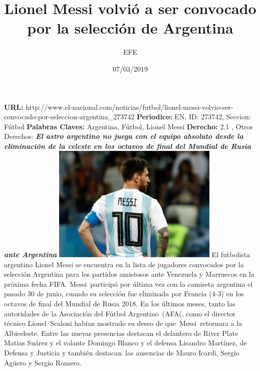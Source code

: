 \documentclass{article}%
\title{\textbf{Lionel Messi volvió a ser convocado por la selección de Argentina}}%
\author{EFE}%
\date{07/03/2019}%
\begin{document}
%
\normalsize%
\maketitle%
\textbf{URL: }%
http://www.el{-}nacional.com/noticias/futbol/lionel{-}messi{-}volvio{-}ser{-}convocado{-}por{-}seleccion{-}argentina\_273742\newline%
%
\textbf{Periodico: }%
EN, %
ID: %
273742, %
Seccion: %
Fútbol\newline%
%
\textbf{Palabras Claves: }%
Argentina, Fútbol, Lionel Messi\newline%
%
\textbf{Derecho: }%
2.1%
, Otros Derechos: %
\newline%
%
\textbf{\textit{El astro argentino no juega con el equipo absoluto desde la eliminación de la celeste en los octavos de final del Mundial de Rusia ante Argentina}}%
\newline%
\newline%
%
\includegraphics[width=300px]{EN_273742.jpg}%
\newline%
%
El futbolista argentino Lionel Messi se encuentra en la lista de jugadores convocados por la selección Argentina para los partidos amistosos ante Venezuela y Marruecos en la próxima fecha FIFA.%
\newline%
%
Messi~participó por última vez con la camiseta argentina el pasado 30 de junio, cuando su selección fue eliminada por Francia (4{-}3) en los octavos de final del Mundial de Rusia 2018.%
\newline%
%
En los últimos meses, tanto las autoridades de la Asociación del Fútbol Argentino~(AFA(, como el director técnico Lionel~Scaloni habían mostrado su deseo de que~Messi~retornara a la Albiceleste.%
\newline%
%
Entre las nuevas presencias destacan el delantero de River Plate Matías Suárez y el volante Domingo Blanco y el defensa Lisandro Martínez, de Defensa y Justicia y también destacan~las ausencias de Mauro Icardi, Sergio Agüero y Sergio Romero.%
\newline%
%
\end{document}
